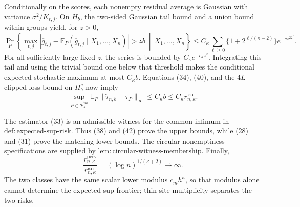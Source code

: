 Conditionally on the scores, each nonempty residual average is Gaussian with variance \(\sigma^2/K_{t,j}\). On \(H_b\), the two-sided Gaussian tail bound and a union bound within groups yield, for \(z>0\),
\[
 \Pr_P\left\{
 \max_{t,j}\left|\overline g_{t,j}-\mathbb E_P(\overline g_{t,j}\mid X_1,\ldots,X_n)\right|>zb
 \ \middle|\ X_1,\ldots,X_n\right\}
 \le C_{\kappa}\sum_{\ell\ge0}
 \{1+2^{\ell/(\kappa-2)}\}e^{-cz^22^\ell}. \tag{41}
\]
For all sufficiently large fixed \(z\), the series is bounded by \(C_{\kappa}e^{-c_{\kappa}z^2}\). Integrating this tail and using the trivial bound one below that threshold makes the conditional expected stochastic maximum at most \(C_{\kappa}b\). Equations (34), (40), and the \(4L\) clipped-loss bound on \(H_b^c\) now imply
\[
 \sup_{P\in\mathcal P_{\kappa}^{\mathrm{iso}}}
 \mathbb E_P\lVert\widetilde\tau_{n,b}-\tau_P\rVert_{\infty}
 \le C_{\kappa}b
 \le C_{\kappa}r_{n,\kappa}^{\mathrm{iso}}. \tag{42}
\]

The estimator (33) is an admissible witness for the common infimum in \(\mathrm{def:expected\text{-}sup\text{-}risk}\). Thus (38) and (42) prove the upper bounds, while (28) and (31) prove the matching lower bounds. The circular nonemptiness specifications are supplied by \(\mathrm{lem:circular\text{-}witness\text{-}membership}\). Finally,
\[
 \frac{r_{n,\kappa}^{\mathrm{perv}}}{r_{n,\kappa}^{\mathrm{iso}}}
 =(\log n)^{1/(\kappa+2)}\longrightarrow\infty.
\]
The two classes have the same scalar lower modulus \(c_mh^{\kappa}\), so that modulus alone cannot determine the expected-sup frontier; thin-site multiplicity separates the two risks.